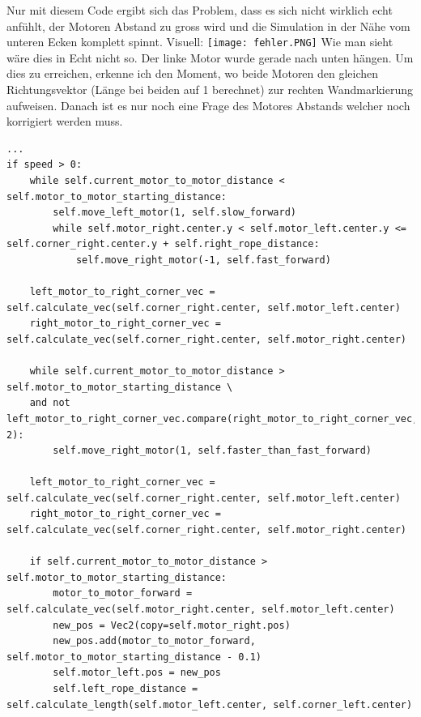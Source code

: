 \documentclass[12pt]{article}
\begin{document}
Nur mit diesem Code ergibt sich das Problem, dass es sich nicht wirklich echt anfühlt, der Motoren Abstand zu gross wird und die Simulation in der Nähe vom unteren Ecken komplett spinnt. Visuell: \newline
\texttt{[image: fehler.PNG]}
Wie man sieht wäre dies in Echt nicht so. Der linke Motor wurde gerade nach unten hängen. Um dies zu erreichen, erkenne ich den Moment, wo beide Motoren den gleichen Richtungsvektor (Länge bei beiden auf 1 berechnet) zur rechten Wandmarkierung aufweisen. Danach ist es nur noch eine Frage des Motores Abstands welcher noch korrigiert werden muss.
\begin{lstlisting}
...
if speed > 0:
	while self.current_motor_to_motor_distance < self.motor_to_motor_starting_distance:
		self.move_left_motor(1, self.slow_forward)
		while self.motor_right.center.y < self.motor_left.center.y <= self.corner_right.center.y + self.right_rope_distance:
			self.move_right_motor(-1, self.fast_forward)
			
	left_motor_to_right_corner_vec = self.calculate_vec(self.corner_right.center, self.motor_left.center)
	right_motor_to_right_corner_vec = self.calculate_vec(self.corner_right.center, self.motor_right.center)
	
	while self.current_motor_to_motor_distance > self.motor_to_motor_starting_distance \
	and not left_motor_to_right_corner_vec.compare(right_motor_to_right_corner_vec, 2):
		self.move_right_motor(1, self.faster_than_fast_forward)
	
	left_motor_to_right_corner_vec = self.calculate_vec(self.corner_right.center, self.motor_left.center)
	right_motor_to_right_corner_vec = self.calculate_vec(self.corner_right.center, self.motor_right.center)
	
	if self.current_motor_to_motor_distance > self.motor_to_motor_starting_distance:
		motor_to_motor_forward = self.calculate_vec(self.motor_right.center, self.motor_left.center)
		new_pos = Vec2(copy=self.motor_right.pos)
		new_pos.add(motor_to_motor_forward, self.motor_to_motor_starting_distance - 0.1)
		self.motor_left.pos = new_pos
		self.left_rope_distance = self.calculate_length(self.motor_left.center, self.corner_left.center)
\end{lstlisting}
\end{document}
